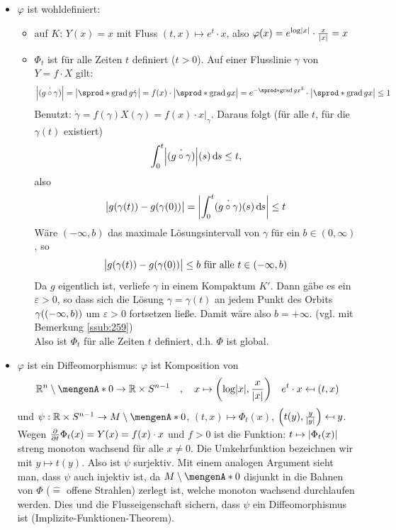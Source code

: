 \begin{itemize}
	\item $\varphi$ ist wohldefiniert:
	\begin{itemize}
		\item auf $K$: $Y(x)=x$ mit Fluss $(t,x) \mapsto e^t \cdot x$, also $\varphi(x) = e^{\log \abs*{x}} \cdot \frac{x}{\abs*{x} } = x $
		\item $\Phi_t$ ist für alle Zeiten $t$ definiert (\oE $t>0$). Auf einer Flusslinie $\gamma$ von $Y = f \cdot X$ gilt:
		\[
			\abs*{\dot{(g \circ  \gamma)}} = \abs[\big]{ \sprod*{\grad g}{\dot{\gamma}} }  = f(x) \cdot \abs[\big]{ \sprod*{\grad g}{x} } = e^{- \sprod*{\grad g}{x}^2 }
			\cdot \abs[\big]{ \sprod*{\grad g}{x} } \le 1
		\]
		Benutzt: $\dot{\gamma} = f(\gamma) X(\gamma)= f(x)\cdot x \Big|_{\gamma}$. Daraus folgt (für alle $t$, für die $\gamma(t)$ existiert)
		\[
			\int_{0} ^{t} \abs*{\dot{(g \circ \gamma)}}(s)  \, \mathd s \le t , 
		\]
		also 
		\[
			\abs[\big]{ g \enbrace*{\gamma(t)} - g \enbrace*{\gamma(0)}  } = \abs*{ \int_{0} ^{t} \! \dot{(g \circ  \gamma)} (s)  \, \mathd s } \le t  
		\]
		Wäre $(-\infty, b)$ das maximale Lösungsintervall von $\gamma$ für ein $b \in (0,\infty)$, so 
		\[
			\abs[\big]{ g \enbrace*{\gamma(t)} - g \enbrace*{\gamma(0)} } \le b \text{ für alle } t \in (-\infty,b)
		\]
		Da $g$ eigentlich ist, verliefe $\gamma$ in einem Kompaktum $K'$. Dann gäbe es ein $\varepsilon>0$, so dass sich die Lösung $\gamma= \gamma(t)$ an jedem Punkt des 
		Orbits $\gamma \enbrace*{(-\infty, b)}$ um $\varepsilon >0$ fortsetzen ließe. Damit wäre also $b= + \infty$. \hfill (vgl. mit Bemerkung \ref{ssub:259}) \\
		Also ist $\Phi_t$ für alle Zeiten $t$ definiert, d.h. $\Phi$ ist global.
	\end{itemize}
	\item $\varphi$ ist ein Diffeomorphismus: $\varphi$ ist Komposition von 
	\[
		\mathds{R}^n \setminus \set{0} \to \mathds{R} \times S^{n-1} \quad ,\quad x \mapsto \enbrace*{ \log \abs*{x}, \frac{x}{\abs*{x} }  } \quad  e^t \cdot x \mapsfrom 
		(t,x)
	\]
	und $\psi : \mathds{R} \times S^{n-1} \to M \setminus \set{0}$, $(t,x) \mapsto \Phi_t(x)$, $\enbrace*{t(y), \frac{y}{\abs*{y} }}  \mapsfrom y$. Wegen 
	$\diff{}{t} \Phi_t(x) = Y(x) = f(x) \cdot x$ und $f>0$ ist die Funktion: $t \mapsto \abs*{\Phi_t(x)}$ streng monoton wachsend für alle $x \not= 0$. Die Umkehrfunktion
	bezeichnen wir mit $y \mapsto t(y)$. Also ist $\psi$ surjektiv. Mit einem analogen Argument sieht man, dass $\psi$ auch injektiv ist, da $M \setminus \set{0}$ disjunkt
	in die Bahnen von $\Phi$ ($\widehat{=}$ offene Strahlen) zerlegt ist, welche monoton wachsend durchlaufen werden. Dies und die Flusseigenschaft sichern, dass $\psi$
	ein Diffeomorphismus ist (Implizite-Funktionen-Theorem). \bewende
\end{itemize}
